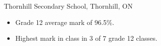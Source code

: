 \documentclass[11pt, margin]{res}
\begin{document}
\begin{resume}
                    Thornhill Secondary School, Thornhill, ON
                    \begin{itemize}[itemsep=-2pt]
                        \item Grade 12 average mark of 96.5\%.
                        \item Highest mark in class in 3 of 7 grade 12 classes.
                    \end{itemize}




\end{resume}
\end{document}

